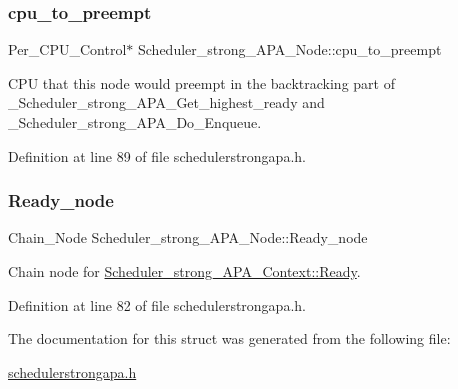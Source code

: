 \mbox{\label{structScheduler__strong__APA__Node_af88ba145a84fd95d104f2bb48e462ed2}} 
\subsubsection{\texorpdfstring{cpu\+\_\+to\+\_\+preempt}{cpu\_to\_preempt}}
{\footnotesize\ttfamily Per\+\_\+\+C\+P\+U\+\_\+\+Control$\ast$ Scheduler\+\_\+strong\+\_\+\+A\+P\+A\+\_\+\+Node\+::cpu\+\_\+to\+\_\+preempt}



C\+PU that this node would preempt in the backtracking part of \+\_\+\+Scheduler\+\_\+strong\+\_\+\+A\+P\+A\+\_\+\+Get\+\_\+highest\+\_\+ready and \+\_\+\+Scheduler\+\_\+strong\+\_\+\+A\+P\+A\+\_\+\+Do\+\_\+\+Enqueue. 



Definition at line 89 of file schedulerstrongapa.\+h.

\mbox{\label{structScheduler__strong__APA__Node_a275ee9d3d456dcfd308e2eab306bf581}} 
\subsubsection{\texorpdfstring{Ready\+\_\+node}{Ready\_node}}
{\footnotesize\ttfamily Chain\+\_\+\+Node Scheduler\+\_\+strong\+\_\+\+A\+P\+A\+\_\+\+Node\+::\+Ready\+\_\+node}



Chain node for \hyperlink{structScheduler__strong__APA__Context_a0c445c35a07b8aa14f9d76c6dfb4916c}{Scheduler\+\_\+strong\+\_\+\+A\+P\+A\+\_\+\+Context\+::\+Ready}. 



Definition at line 82 of file schedulerstrongapa.\+h.



The documentation for this struct was generated from the following file\+:\begin{DoxyCompactItemize}
\item 
\hyperlink{schedulerstrongapa_8h}{schedulerstrongapa.\+h}\end{DoxyCompactItemize}
